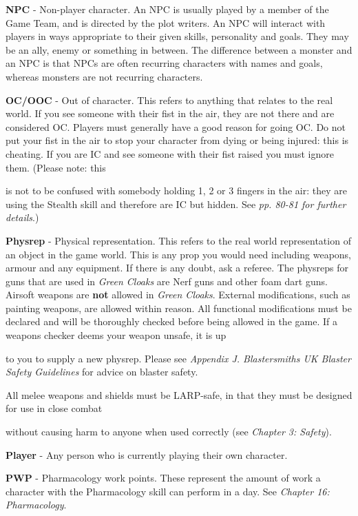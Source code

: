 \documentclass{scrbook}
\begin{document}
\textbf{NPC} - Non-player character. An NPC is usually played by a member of the Game Team, and is directed by the plot writers. An NPC will interact with players in ways appropriate to their given skills, personality and goals. They may be an ally, enemy or something in between. The difference between a monster and an NPC is that NPCs are often recurring characters with names and goals, whereas monsters are not recurring characters.

\textbf{OC/OOC} - Out of character. This refers to anything that relates to the real world. If you see someone with their fist in the air, they are not there and are considered OC. Players must generally have a good reason for going OC. Do not put your fist in the air to stop your character from dying or being injured: this is cheating. If you are IC and see someone with their fist raised you must ignore them. (Please note: this

is not to be confused with somebody holding 1, 2 or 3 fingers in the air: they are using the Stealth skill and therefore are IC but hidden. See \textit{pp. 80-81 for further details}.)

\textbf{Physrep} - Physical representation. This refers to the real world representation of an object in the game world. This is any prop you would need including weapons, armour and any equipment. If there is any doubt, ask a referee. The physreps for guns that are used in \textit{Green Cloaks} are Nerf guns and other foam dart guns. Airsoft weapons are \textbf{not} allowed in \textit{Green Cloaks}. External modifications, such as painting weapons, are allowed within reason. All functional modifications must be declared and will be thoroughly checked before being allowed in the game. If a weapons checker deems your weapon unsafe, it is up

to you to supply a new physrep. Please see \textit{Appendix J. Blastersmiths UK Blaster Safety Guidelines} for advice on blaster safety.

All melee weapons and shields must be LARP-safe, in that they must be designed for use in close combat

without causing harm to anyone when used correctly (see \textit{Chapter 3: Safety}).

\textbf{Player} - Any person who is currently playing their own character.

\textbf{PWP} - Pharmacology work points. These represent the amount of work a character with the Pharmacology skill can perform in a day. See \textit{Chapter 16: Pharmacology}.
\end{document}
